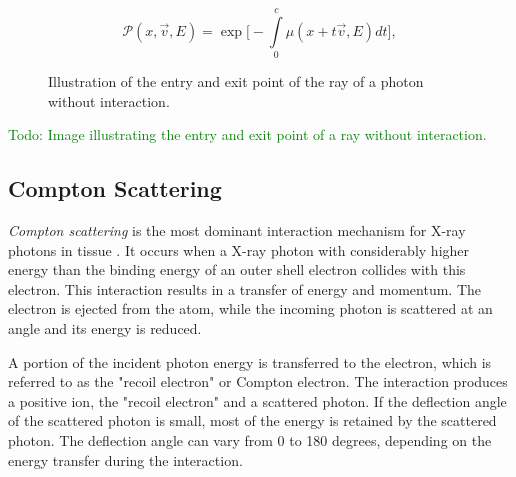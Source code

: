 $$\mathcal{P}(x, \vec{v}, E) = \exp \bigg[ -\int\limits_{0}^{c}{\mu(x+t\vec{v}, E)} dt \bigg],$$

\begin{figure}[H]
    \centering
    \caption{Illustration of the entry and exit point of the ray of a photon without interaction.}
    \label{fig:exit_point}
\end{figure}

\textcolor{green}{Todo: Image illustrating the entry and exit point of a ray without interaction.}


\subsection{Compton Scattering}
\emph{Compton scattering} is the most dominant interaction mechanism for X-ray
photons in tissue \cite[Chap. 7]{medicalImagingSystemsIntro2019:}. It occurs
when a X-ray photon with considerably higher energy than the binding energy of an outer shell electron collides with this electron. This interaction
results in a transfer of energy and momentum. The electron is ejected from the atom, while the incoming photon is scattered at an
angle and its energy is reduced.

A portion of the incident photon energy is transferred to the electron, which
is referred to as the "recoil electron" or Compton electron. The interaction
produces a positive ion, the "recoil electron" and a scattered photon. If the deflection angle of the scattered photon is small, most of the energy is retained by the scattered photon. The deflection angle can vary from 0 to 180 degrees, depending on the energy transfer during the interaction.

